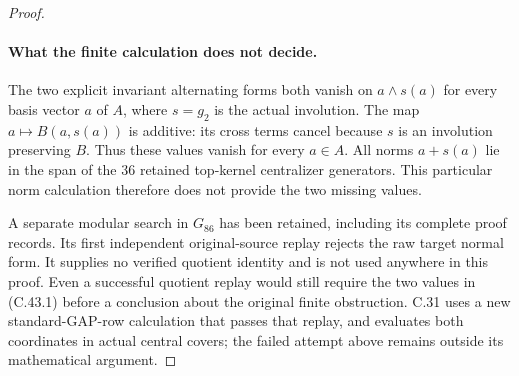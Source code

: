 \begin{proof}
\paragraph{What the finite calculation does not decide.}
The two explicit invariant alternating forms both vanish on
$a\wedge s(a)$ for every basis vector $a$ of $A$, where
$s=g_2$ is the actual involution.  The map
$a\mapsto B(a,s(a))$ is additive: its cross terms cancel because
$s$ is an involution preserving $B$.  Thus these values vanish for
every $a\in A$.  All norms $a+s(a)$ lie in the span of the $36$
retained top-kernel centralizer generators.  This particular norm
calculation therefore does not provide the two missing values.

A separate modular search in $G_{86}$ has been retained, including
its complete proof records.  Its first independent original-source
replay rejects the raw target normal form.  It supplies no verified
quotient identity and is not used anywhere in this proof.  Even a
successful quotient replay would still require the two values in
(C.43.1) before a conclusion about the original finite obstruction.
C.31 uses a new standard-GAP-row calculation that passes that replay,
and evaluates both coordinates in actual central covers; the failed
attempt above remains outside its mathematical argument.
\end{proof}

